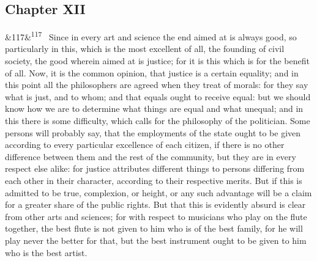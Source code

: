 \documentclass[12pt]{article}
\newcommand{\para}[1][]{\par\noindent\ifx&#1&\else\textsuperscript{\footnotesize #1}~\fi}
\begin{document}
\subsection*{Chapter XII}

\para[117] Since in every art and science the end aimed at is always good, so particularly in this, which is the most excellent of all, the founding of civil society, the good wherein aimed at is justice; for it is this which is for the benefit of all. Now, it is the common opinion, that justice is a certain equality; and in this point all the philosophers are agreed when they treat of morals: for they say what is just, and to whom; and that equals ought to receive equal: but we should know how we are to determine what things are equal and what unequal; and in this there is some difficulty, which calls for the philosophy of the politician. Some persons will probably say, that the employments of the state ought to be given according to every particular excellence of each citizen, if there is no other difference between them and the rest of the community, but they are in every respect else alike: for justice attributes different things to persons differing from each other in their character, according to their respective merits. But if this is admitted to be true, complexion, or height, or any such advantage will be a claim for a greater share of the public rights. But that this is evidently absurd is clear from other arts and sciences; for with respect to musicians who play on the flute together, the best flute is not given to him who is of the best family, for he will play never the better for that, but the best instrument ought to be given to him who is the best artist.
\end{document}

